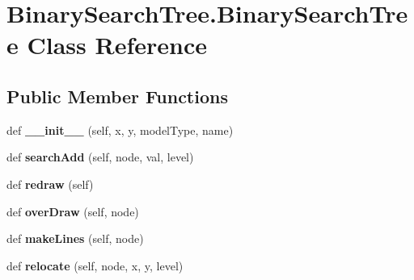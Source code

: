 \hypertarget{class_binary_search_tree_1_1_binary_search_tree}{}\section{Binary\+Search\+Tree.\+Binary\+Search\+Tree Class Reference}
\label{class_binary_search_tree_1_1_binary_search_tree}
\subsection*{Public Member Functions}
\begin{DoxyCompactItemize}
\item 
def {\bfseries \+\_\+\+\_\+init\+\_\+\+\_\+} (self, x, y, model\+Type, name)\hypertarget{class_binary_search_tree_1_1_binary_search_tree_a427e86bf2d372a1b518489843bc85103}{}\label{class_binary_search_tree_1_1_binary_search_tree_a427e86bf2d372a1b518489843bc85103}

\item 
def {\bfseries search\+Add} (self, node, val, level)\hypertarget{class_binary_search_tree_1_1_binary_search_tree_a5168edcb8e13e75c4d9f9d016cf922e0}{}\label{class_binary_search_tree_1_1_binary_search_tree_a5168edcb8e13e75c4d9f9d016cf922e0}

\item 
def {\bfseries redraw} (self)\hypertarget{class_binary_search_tree_1_1_binary_search_tree_a590449bc083a03f8746362ae21081c6b}{}\label{class_binary_search_tree_1_1_binary_search_tree_a590449bc083a03f8746362ae21081c6b}

\item 
def {\bfseries over\+Draw} (self, node)\hypertarget{class_binary_search_tree_1_1_binary_search_tree_a78d7a635850da8941d434365d6447f75}{}\label{class_binary_search_tree_1_1_binary_search_tree_a78d7a635850da8941d434365d6447f75}

\item 
def {\bfseries make\+Lines} (self, node)\hypertarget{class_binary_search_tree_1_1_binary_search_tree_a64a520f74e40f705873893befbe905c3}{}\label{class_binary_search_tree_1_1_binary_search_tree_a64a520f74e40f705873893befbe905c3}

\item 
def {\bfseries relocate} (self, node, x, y, level)\hypertarget{class_binary_search_tree_1_1_binary_search_tree_ae3acf8c976ea9f9dd05d381954c430ed}{}\label{class_binary_search_tree_1_1_binary_search_tree_ae3acf8c976ea9f9dd05d381954c430ed}


\end{DoxyCompactItemize}
